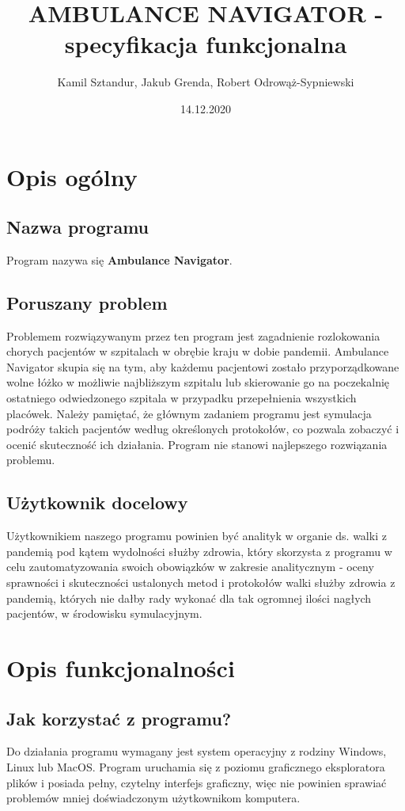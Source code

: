 \documentclass{article}
\title{\textbf{AMBULANCE NAVIGATOR - specyfikacja funkcjonalna}}
\author{Kamil Sztandur, Jakub Grenda, Robert Odrowąż-Sypniewski}
\date{14.12.2020}
\newcommand\tab[1][1cm]{\hspace*{#1}}
\begin{document}
\begin{tcolorbox}
\maketitle
\end{tcolorbox}
\newpage

\section{Opis ogólny}
\subsection{Nazwa programu}
\tab Program nazywa się \textbf{Ambulance Navigator}.

\subsection{Poruszany problem}
\tab Problemem rozwiązywanym przez ten program jest zagadnienie rozlokowania chorych pacjentów w szpitalach w obrębie kraju w dobie pandemii. Ambulance Navigator skupia się na tym, aby każdemu pacjentowi zostało przyporządkowane wolne łóżko w możliwie najbliższym szpitalu lub skierowanie go na poczekalnię ostatniego odwiedzonego szpitala w przypadku przepełnienia wszystkich placówek. 
\newline \tab Należy pamiętać, że głównym zadaniem programu jest symulacja podróży takich pacjentów według określonych protokołów, co pozwala zobaczyć i ocenić skuteczność ich działania. Program nie stanowi najlepszego rozwiązania problemu.

\subsection{Użytkownik docelowy}
\tab Użytkownikiem naszego programu powinien być analityk w organie ds. walki z pandemią pod kątem wydolności służby zdrowia, który skorzysta z programu w celu zautomatyzowania swoich obowiązków w zakresie analitycznym - oceny sprawności i skuteczności ustalonych metod i protokołów walki służby zdrowia z pandemią, których nie dałby rady wykonać dla tak ogromnej ilości nagłych pacjentów, w środowisku symulacyjnym.

\section{Opis funkcjonalności}
\subsection{Jak korzystać z programu?}
\tab Do działania programu wymagany jest system operacyjny z rodziny Windows, Linux lub MacOS. Program uruchamia się z poziomu graficznego eksploratora plików i posiada pełny, czytelny interfejs graficzny, więc nie powinien sprawiać problemów mniej doświadczonym użytkownikom komputera.
\end{document}
